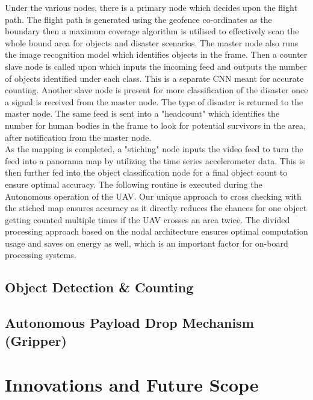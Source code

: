 \documentclass[12pt]{report}
\begin{document}
Under the various nodes, there is a primary node which decides upon the flight path. The flight path is generated using the geofence co-ordinates as the boundary then a maximum coverage algorithm is utilised to effectively scan the whole bound area for objects and disaster scenarios. The master node also runs the image recognition model which identifies objects in the frame. Then a counter slave node is called upon which inputs the incoming feed and outputs the number of objects identified under each class. This is a separate CNN meant for accurate counting. Another slave node is present for more classification of the disaster once a signal is received from the master node. The type of disaster is returned to the master node. The same feed is sent into a "headcount" which identifies the number for human bodies in the frame to look for potential survivors in the area, after notification from the master node.\\

As the mapping is completed, a "stiching" node inputs the video feed to turn the feed into a panorama map by utilizing the time series accelerometer data. This is then further fed into the object classification node for a final object count to ensure optimal accuracy. The following routine is executed during the Autonomous operation of the UAV. Our unique approach to cross checking with the stiched map ensures accuracy as it directly reduces the chances for one object getting counted multiple times if the UAV crosses an area twice. The divided processing approach based on the nodal architecture ensures optimal computation usage and saves on energy as well, which is an important factor for on-board processing systems.

    \section{Object Detection \& Counting}
    \section{Autonomous Payload Drop Mechanism (Gripper)}

  \chapter{Innovations and Future Scope}
\end{document}
